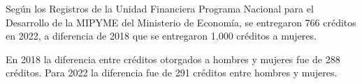 Según los Registros de la Unidad Financiera Programa Nacional para el Desarrollo de la MIPYME del Ministerio de Economía, se entregaron 766 créditos en 2022, a diferencia de 2018 que se entregaron 1,000 créditos a mujeres.

En 2018 la diferencia entre créditos otorgados a hombres y mujeres fue de 288 créditos. Para 2022 la diferencia fue de 291 créditos entre hombres y mujeres. 